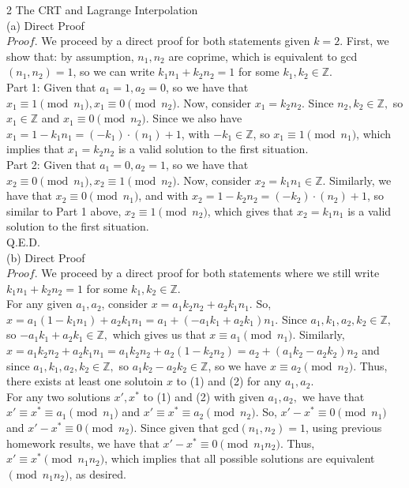\documentclass{article}
\begin{document}
{\Large 2 The CRT and Lagrange Interpolation} \\[.5cm]
(a) Direct Proof \\[.1cm]
$\textit{Proof.}$ We proceed by a direct proof for both statements given $k = 2$. First, we show that: by assumption, $n_1, n_2$ are coprime, which is equivalent to gcd$(n_1, n_2) = 1$, so we can write $k_1n_1 + k_2n_2 = 1$ for some $k_1, k_2\in\mathbb{Z}$.
\\[.1cm]
\indent Part 1: Given that $a_1 = 1, a_2 = 0$, so we have that $x_1\equiv1\pmod{n_1}, x_1\equiv0\pmod{n_2}$.
Now, consider $x_1 = k_2n_2$. Since $n_2, k_2\in\mathbb{Z},$ so $x_1\in\mathbb{Z}$ and $x_1\equiv0\pmod{n_2}.$ Since we also have $x_1 = 1 - k_1n_1 = (-k_1)\cdot(n_1) + 1$, with $-k_1\in\mathbb{Z}$, so $x_1\equiv1\pmod{n_1}$, which implies that $x_1 = k_2n_2$ is a valid solution to the first situation. \\[.1cm]
\indent Part 2: Given that $a_1 = 0, a_2 = 1$, so we have that $x_2\equiv0\pmod{n_1}, x_2\equiv1\pmod{n_2}$.
Now, consider $x_2 = k_1n_1\in\mathbb{Z}$. Similarly, we have that $x_2\equiv0\pmod{n_1}$, and with $x_2 = 1 - k_2n_2 = (-k_2)\cdot(n_2) + 1$, so similar to Part 1 above, $x_2\equiv1\pmod{n_2}$, which gives that $x_2 = k_1n_1$ is a valid solution to the first situation. \\[.1cm]
Q.E.D. \\[.3cm]
(b) Direct Proof \\[.1cm]
$\textit{Proof.}$ We proceed by a direct proof for both statements where we still write $k_1n_1 + k_2n_2 = 1$ for some $k_1, k_2\in\mathbb{Z}$. \\[.1cm]
\indent For any given $a_1, a_2$, consider $x = a_1k_2n_2 + a_2k_1n_1$. So, $x = a_1(1 - k_1n_1) + a_2k_1n_1 = a_1 + (-a_1k_1 + a_2k_1)n_1$. Since $a_1, k_1, a_2, k_2\in\mathbb{Z},$ so $-a_1k_1 + a_2k_1\in\mathbb{Z},$ which gives us that $x\equiv a_1\pmod{n_1}$. Similarly, $x = a_1k_2n_2 + a_2k_1n_1 = a_1k_2n_2 + a_2(1 - k_2n_2) = a_2 + (a_1k_2 - a_2k_2)n_2$ and since $a_1, k_1, a_2, k_2\in\mathbb{Z},$ so $a_1k_2 - a_2k_2\in\mathbb{Z}$, so we have $x\equiv a_2\pmod{n_2}$. Thus, there exists at least one solutoin $x$ to (1) and (2) for any $a_1, a_2.$ \\[.1cm]
\indent For any two solutions $x', x^*$ to (1) and (2) with given $a_1, a_2,$ we have that $x'\equiv x^*\equiv a_1\pmod{n_1}$ and $x'\equiv x^*\equiv a_2\pmod{n_2}.$ So, $x'-x^*\equiv0\pmod{n_1}$ and $x'-x^*\equiv0\pmod{n_2}$. Since given that gcd$(n_1, n_2) = 1$, using previous homework results, we have that $x'-x^*\equiv0\pmod{n_1n_2}$. Thus, $x'\equiv x^*\pmod{n_1n_2}$, which implies that all possible solutions are equivalent $\pmod{n_1n_2}$, as desired. \\[.1cm]
\end{document}
